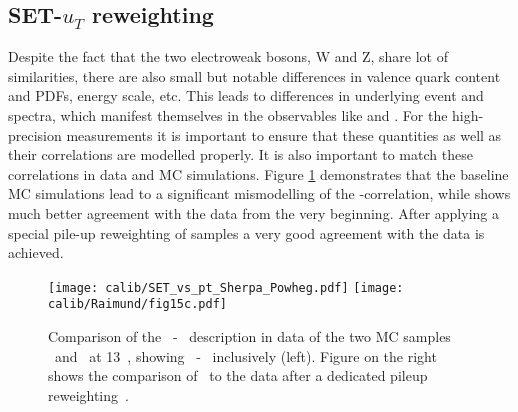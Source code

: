      \subsection{SET-$u_T$ reweighting }
     Despite the fact that the two electroweak bosons, W and Z, share  lot of similarities, there are also small but notable differences in valence quark content and PDFs, energy scale, etc. This leads to differences in underlying event and \ptv spectra, which manifest themselves in the observables like \set and \setue. For the high-precision measurements it is important to ensure that these quantities as well as their correlations are modelled properly. It is also important to match these correlations in data and MC simulations. Figure \ref{fig:setSherpa} demonstrates that the baseline \Powheg MC simulations lead to a significant mismodelling of the \setue-\ptz correlation, while \Sherpa shows much better agreement with the data from the very beginning. After applying a special pile-up reweighting of \Sherpa samples a very good agreement with the data is achieved.
     
	\begin{figure}[tp]
		\centering
			\texttt{[image: calib/SET\_vs\_pt\_Sherpa\_Powheg.pdf]}
			\texttt{[image: calib/Raimund/fig15c.pdf]}
		\caption{Comparison of the \set\ - \ptll\ description in data of the two MC
			samples \POWHEG\ and \SHERPA\ at 13~\TeV, showing \set\ - \ptll\ inclusively
			(left). Figure on the right shows the comparison of \SHERPA\ to the data after a dedicated
			pileup reweighting~\cite{int_note_hr}. }
		\label{fig:setSherpa}
	\end{figure}
	
